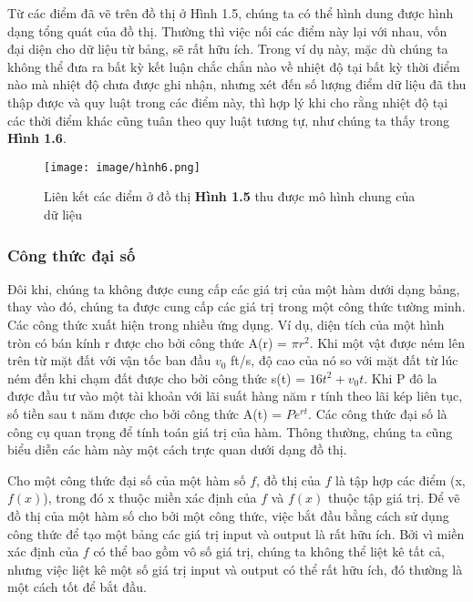 \documentclass[a4paper,12pt,openany]{book}
\begin{document}
Từ các điểm đã vẽ trên đồ thị ở Hình 1.5, chúng ta có thể hình dung được hình dạng tổng quát của đồ thị. Thường thì việc nối các điểm này lại với nhau, vốn đại diện cho dữ liệu từ bảng, sẽ rất hữu ích. Trong ví dụ này, mặc dù chúng ta không thể đưa ra bất kỳ kết luận chắc chắn nào về nhiệt độ tại bất kỳ thời điểm nào mà nhiệt độ chưa được ghi nhận, nhưng xét đến số lượng điểm dữ liệu đã thu thập được và quy luật trong các điểm này, thì hợp lý khi cho rằng nhiệt độ tại các thời điểm khác cũng tuân theo quy luật tương tự, như chúng ta thấy trong \textbf{Hình 1.6}.

\begin{figure}[H]
    \centering
    \texttt{[image: image/hình6.png]}
    \caption{Liên kết các điểm ở đồ thị \textbf{Hình 1.5} thu được mô hình chung của dữ liệu}
    \label{fig:enter-label}
\end{figure}

\clearpage
\subsubsection{Công thức đại số}

Đôi khi, chúng ta không được cung cấp các giá trị của một hàm dưới dạng bảng, thay vào đó, chúng ta được cung cấp các giá trị trong một công thức tường minh. Các công thức xuất hiện trong nhiều ứng dụng. Ví dụ, diện tích của một hình tròn có bán kính r được cho bởi công thức A(r) = \(\pi r^2\). Khi một vật được ném lên trên từ mặt đất với vận tốc ban đầu \(v_0\) ft/s, độ cao của nó so với mặt đất từ lúc ném đến khi chạm đất được cho bởi công thức s(t) = \(16t^2 + v_0t\). Khi P đô la được đầu tư vào một tài khoản với lãi suất hàng năm r tính theo lãi kép liên tục, số tiền sau t năm được cho bởi công thức A(t) = \(Pe^{rt}\). Các công thức đại số là công cụ quan trọng để tính toán giá trị của hàm. Thông thường, chúng ta cũng biểu diễn các hàm này một cách trực quan dưới dạng đồ thị. \par

\vspace{10pt}

Cho một công thức đại số của một hàm số $f$, đồ thị của $f$ là tập hợp các điểm (x, $f(x)$), trong đó x thuộc miền xác định của $f$ và $f(x)$ thuộc tập giá trị. Để vẽ đồ thị của một hàm số cho bởi một công thức, việc bắt đầu bằng cách sử dụng công thức để tạo một bảng các giá trị input và output là rất hữu ích. Bởi vì miền xác định của $f$ có thể bao gồm vô số giá trị, chúng ta không thể liệt kê tất cả, nhưng việc liệt kê một số giá trị input và output có thể rất hữu ích, đó thường là một cách tốt để bắt đầu. 
\par
\vspace{10pt}
\end{document}
